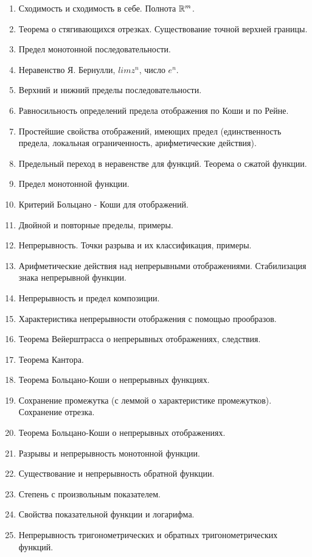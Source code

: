\documentclass[12pt, a4paper]{article}
\begin{document}
\begin{enumerate}
    \item Сходимость и сходимость в себе. Полнота ${\mathbb{R}}^m$.
    \item Теорема о стягивающихся отрезках. Существование точной верхней границы.
    \item Предел монотонной последовательности.
    \item Неравенство Я. Бернулли, $lim z^n$, число $e^n$.
    \item Верхний и нижний пределы последовательности.
    \item Равносильность определений предела отображения по Коши и по Рейне.
    \item Простейшие свойства отображений, имеющих предел (единственность предела, локальная ограниченность, арифметические действия).
    \item Предельный переход в неравенстве для функций. Теорема о сжатой функции.
    \item Предел монотонной функции.
    \item Критерий Больцано - Коши для отображений.
    \item Двойной и повторные пределы, примеры.
    \item Непрерывность. Точки разрыва и их классификация, примеры.
    \item Арифметические действия над непрерывными отображениями. Стабилизация знака непрерывной функции.
    \item Непрерывность и предел композиции.
    \item Характеристика непрерывности отображения с помощью прообразов.
    \item Теорема Вейерштрасса о непрерывных отображениях, следствия.
    \item Теорема Кантора.
    \item Теорема Больцано-Коши о непрерывных функциях.
    \item Сохранение промежутка (с леммой о характеристике промежутков). Сохранение отрезка.
    \item Теорема Больцано-Коши о непрерывных отображениях.
    \item Разрывы и непрерывность монотонной функции.
    \item Существование и непрерывность обратной функции.
    \item Степень с произвольным показателем.
    \item Свойства показательной функции и логарифма.
    \item Непрерывность тригонометрических и обратных тригонометрических функций.

\end{enumerate}
\end{document}
